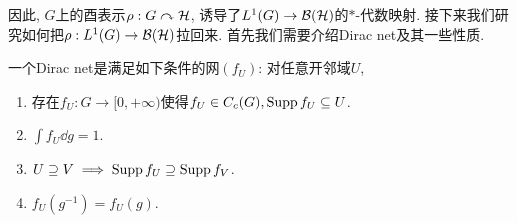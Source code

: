 因此, $G$上的酉表示$\rho:G \curvearrowright \mathcal{H}$, 诱导了$L^1(G) \to \mathcal{B}(\mathcal{H})$的$*$-代数映射. 
接下来我们研究如何把$\rho:L^1(G) \to \mathcal{B}(\mathcal{H})$拉回来. 首先我们需要介绍Dirac net及其一些性质.

\begin{definition}
    一个Dirac net是满足如下条件的网$(f_U)$: 对任意开邻域$U$, \begin{enumerate}
        \item 存在$f_U:G \to [0,+\infty)$使得$f_U \in C_c(G), \operatorname{Supp} f_U \subseteq U$.
        \item $\int f_U \dd g = 1$.
        \item $U \supseteq V \implies \operatorname{Supp} f_U \supseteq \operatorname{Supp} f_V$.
        \item $f_U(g^{-1}) = f_U(g)$.
    \end{enumerate}
\end{definition}

